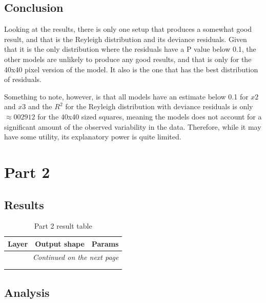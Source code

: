 \documentclass[12pt,a4paper,twoside]{article}
\begin{document}
\subsection{Conclusion}
\label{ssec:conclusion}
Looking at the results, there is only one setup that produces a somewhat good result, and that is the Reyleigh distribution and its deviance residuals.
Given that it is the only distribution where the residuals have a P value below 0.1, the other models are unlikely to produce any good results, and that
is only for the 40x40 pixel version of the model. It also is the one that has the best distribution of residuals.

Something to note, however, is that all models have an estimate below 0.1 for $x2$ and $x3$ and the $R^{2}$ for the Reyleigh distribution with deviance
residuals is only $\approx002912$ for the 40x40 sized squares, meaning the models does not account for a significant amount of the observed variability
in the data. Therefore, while it may have some utility, its explanatory power is quite limited. 


\newpage
\section{Part 2}
\subsection{Results}
\begin{longtable}{l|p{}|p{}}
	\textbf{Layer} & \textbf{Output shape} & \textbf{Params} \\
	\hline
	\endhead
	\hline
	\multicolumn{3}{r}{\emph{Continued on the next page}}    \\
	\endfoot
	\hline
	\endlastfoot
	\hline
	 &  &  \\
	\caption{Part 2 result table}
	\label{tab:part2res}
\end{longtable}
\subsection{Analysis}
\end{document}
